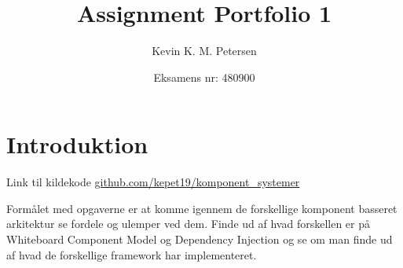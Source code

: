 \title{Assignment Portfolio 1}
\author{Kevin K. M. Petersen \and Eksamens nr: 480900}
\maketitle

\section{Introduktion}
Link til kildekode
\href{https://github.com/kepet19/komponent_systemer}{github.com/kepet19/komponent\_systemer}

Formålet med opgaverne er at komme igennem de forskellige komponent basseret
arkitektur se fordele og ulemper ved dem.
Finde ud af hvad forskellen er på Whiteboard Component Model og Dependency
Injection og se om man finde ud af hvad de forskellige framework har
implementeret.
